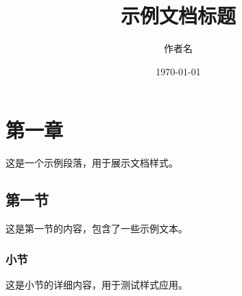 \documentclass[12pt,a4paper]{article}
\begin{document}
\title{示例文档标题}
\author{作者名}
\date{\today}
\maketitle

\section{第一章}
这是一个示例段落，用于展示文档样式。

\subsection{第一节}
这是第一节的内容，包含了一些示例文本。

\subsubsection{小节}
这是小节的详细内容，用于测试样式应用。
\end{document}
